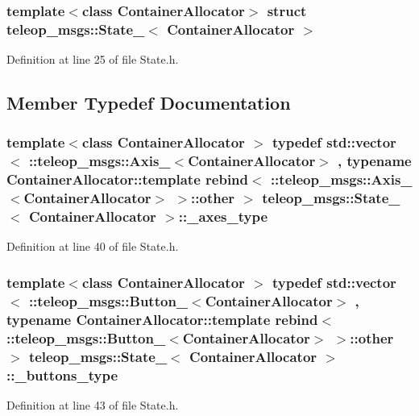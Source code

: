 \subsubsection*{template$<$class ContainerAllocator$>$ struct teleop\_\-msgs::State\_\-$<$ ContainerAllocator $>$}



Definition at line 25 of file State.h.



\subsection{Member Typedef Documentation}
\subsubsection[{\_\-axes\_\-type}]{\setlength{\rightskip}{0pt plus 5cm}template$<$class ContainerAllocator $>$ typedef std::vector$<$ ::{\bf teleop\_\-msgs::Axis\_\-}$<$ContainerAllocator$>$ , typename ContainerAllocator::template rebind$<$ ::{\bf teleop\_\-msgs::Axis\_\-}$<$ContainerAllocator$>$ $>$::other $>$ {\bf teleop\_\-msgs::State\_\-}$<$ ContainerAllocator $>$::{\bf \_\-axes\_\-type}}\label{structteleop__msgs_1_1State___a556e44b8810d5290c9f40d360317c469}


Definition at line 40 of file State.h.

\subsubsection[{\_\-buttons\_\-type}]{\setlength{\rightskip}{0pt plus 5cm}template$<$class ContainerAllocator $>$ typedef std::vector$<$ ::{\bf teleop\_\-msgs::Button\_\-}$<$ContainerAllocator$>$ , typename ContainerAllocator::template rebind$<$ ::{\bf teleop\_\-msgs::Button\_\-}$<$ContainerAllocator$>$ $>$::other $>$ {\bf teleop\_\-msgs::State\_\-}$<$ ContainerAllocator $>$::{\bf \_\-buttons\_\-type}}\label{structteleop__msgs_1_1State___af3565a73e7e193e5d55b7d14e27c7c7a}


Definition at line 43 of file State.h.

